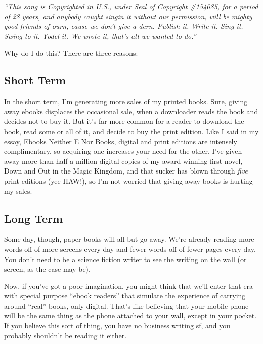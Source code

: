 \textit{``This song is Copyrighted in U.S., under Seal of Copyright
\#154085, for a period of 28 years, and anybody caught singin it
without our permission, will be mighty good friends of ourn, cause we
don't give a dern.  Publish it.  Write it.  Sing it.  Swing to it. 
Yodel it.  We wrote it, that's all we wanted to do.''}

Why do I do this?  There are three reasons:
\subsection{Short Term}

In the short term, I'm generating more sales of my printed books. 
Sure, giving away ebooks displaces the occasional sale, when a
downloader reads the book and decides not to buy it.  But it's far
more common for a reader to download the book, read some or all of it,
and decide to buy the print edition.  Like I said in my essay, 
\href{http://craphound.com/ebooksneitherenorbooks.txt}{Ebooks Neither
E Nor Books}, digital and print editions are intensely
complimentary, so acquiring one increases your need for the other. 
I've given away more than half a million digital copies of my
award-winning first novel, Down and Out in the Magic Kingdom, and that
sucker has blown through \textit{five} print editions (yee-HAW!), so
I'm not worried that giving away books is hurting my sales.

\subsection{Long Term}

Some day, though, paper books will all but go away.  We're already
reading more words off of more screens every day and fewer words off
of fewer pages every day.  You don't need to be a science fiction
writer to see the writing on the wall (or screen, as the case may be).

Now, if you've got a poor imagination, you might think that we'll
enter that era with special purpose ``ebook readers'' that simulate
the experience of carrying around ``real'' books, only digital. 
That's like believing that your mobile phone will be the same thing as
the phone attached to your wall, except in your pocket.  If you
believe this sort of thing, you have no business writing sf, and you
probably shouldn't be reading it either.

